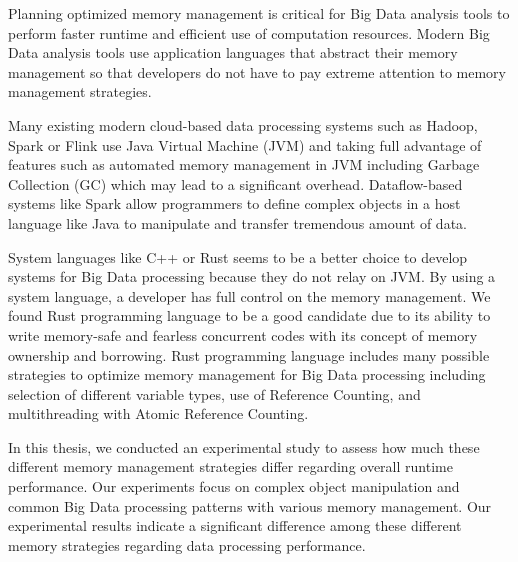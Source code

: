 

Planning optimized memory management is critical for Big Data analysis tools to
perform faster runtime and efficient use of computation resources.
Modern Big Data analysis tools use application languages that abstract their
memory management so that developers do not have to pay extreme attention
to memory management strategies.

Many existing modern cloud-based data processing systems such as Hadoop, Spark or Flink use
Java Virtual Machine (JVM) and taking full advantage of features such as automated memory management in JVM
including Garbage Collection (GC) which may lead to a significant overhead.
Dataflow-based systems like Spark allow programmers to define complex objects in a
host language like Java to manipulate and transfer tremendous amount of data.


System languages like C++ or Rust seems to be a better choice to
develop systems for Big Data processing because they do not relay on JVM.
By using a system language, a developer has full control on the memory management.
We found Rust programming language to be a good candidate due to its ability to write memory-safe and
fearless concurrent codes with its concept of memory ownership and borrowing.
Rust programming language includes many possible strategies to optimize memory management for Big Data processing including
selection of different variable types, use of Reference Counting, and multithreading with Atomic Reference Counting.

In this thesis, we conducted an experimental study to assess how much these different memory management
strategies differ regarding overall runtime performance.
Our experiments focus on complex object manipulation and common Big Data processing patterns
with various memory management. Our experimental results indicate a significant
difference among these different memory strategies regarding data processing performance.
